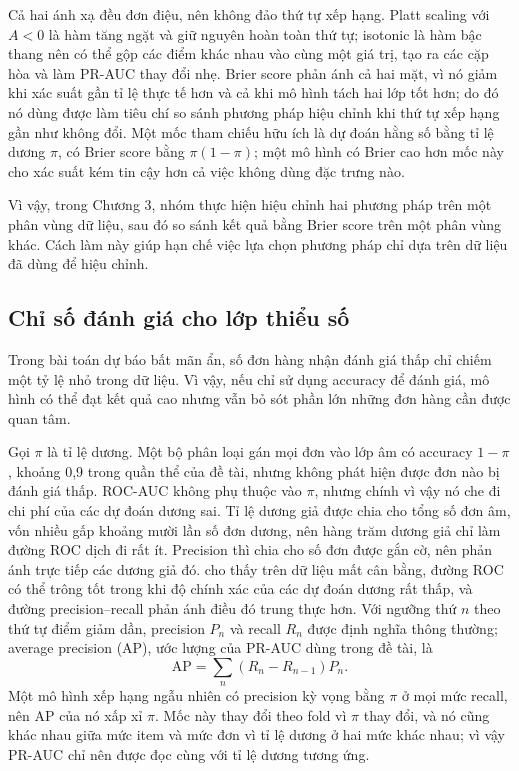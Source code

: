 \documentclass[12pt,a4paper]{report}
\begin{document}
Cả hai ánh xạ đều đơn điệu, nên không đảo thứ tự xếp hạng. Platt scaling với $A<0$ là hàm tăng ngặt và giữ nguyên hoàn toàn thứ tự; isotonic là hàm bậc thang nên có thể gộp các điểm khác nhau vào cùng một giá trị, tạo ra các cặp hòa và làm PR-AUC thay đổi nhẹ. Brier score phản ánh cả hai mặt, vì nó giảm khi xác suất gần tỉ lệ thực tế hơn và cả khi mô hình tách hai lớp tốt hơn; do đó nó dùng được làm tiêu chí so sánh phương pháp hiệu chỉnh khi thứ tự xếp hạng gần như không đổi. Một mốc tham chiếu hữu ích là dự đoán hằng số bằng tỉ lệ dương $\pi$, có Brier score bằng $\pi(1-\pi)$; một mô hình có Brier cao hơn mốc này cho xác suất kém tin cậy hơn cả việc không dùng đặc trưng nào.

Vì vậy, trong Chương 3, nhóm thực hiện hiệu chỉnh hai phương pháp trên một phân vùng dữ liệu, sau đó so sánh kết quả bằng Brier score trên một phân vùng khác. Cách làm này giúp hạn chế việc lựa chọn phương pháp chỉ dựa trên dữ liệu đã dùng để hiệu chỉnh.

\subsection{Chỉ số đánh giá cho lớp thiểu số}\label{sec:th-metrics}

Trong bài toán dự báo bất mãn ẩn, số đơn hàng nhận đánh giá thấp chỉ chiếm một tỷ lệ nhỏ trong dữ liệu. Vì vậy, nếu chỉ sử dụng accuracy để đánh giá, mô hình có thể đạt kết quả cao nhưng vẫn bỏ sót phần lớn những đơn hàng cần được quan tâm.

Gọi $\pi$ là tỉ lệ dương. Một bộ phân loại gán mọi đơn vào lớp âm có accuracy $1-\pi$, khoảng 0,9 trong quần thể của đề tài, nhưng không phát hiện được đơn nào bị đánh giá thấp. ROC-AUC không phụ thuộc vào $\pi$, nhưng chính vì vậy nó che đi chi phí của các dự đoán dương sai. Tỉ lệ dương giả được chia cho tổng số đơn âm, vốn nhiều gấp khoảng mười lần số đơn dương, nên hàng trăm dương giả chỉ làm đường ROC dịch đi rất ít. Precision thì chia cho số đơn được gắn cờ, nên phản ánh trực tiếp các dương giả đó. \textcite{saito2015} cho thấy trên dữ liệu mất cân bằng, đường ROC có thể trông tốt trong khi độ chính xác của các dự đoán dương rất thấp, và đường precision--recall phản ánh điều đó trung thực hơn. Với ngưỡng thứ $n$ theo thứ tự điểm giảm dần, precision $P_n$ và recall $R_n$ được định nghĩa thông thường; average precision (AP), ước lượng của PR-AUC dùng trong đề tài, là
\begin{equation}\label{eq:th-ap}
  \mathrm{AP} = \sum_{n} \left( R_n - R_{n-1} \right) P_n .
\end{equation}
Một mô hình xếp hạng ngẫu nhiên có precision kỳ vọng bằng $\pi$ ở mọi mức recall, nên AP của nó xấp xỉ $\pi$. Mốc này thay đổi theo fold vì $\pi$ thay đổi, và nó cũng khác nhau giữa mức item và mức đơn vì tỉ lệ dương ở hai mức khác nhau; vì vậy PR-AUC chỉ nên được đọc cùng với tỉ lệ dương tương ứng.
\end{document}
